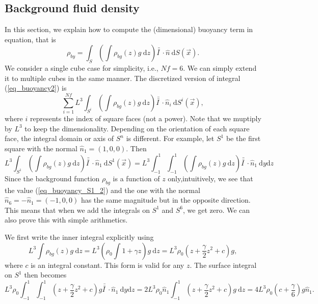  \subsection{Background fluid density}
In this section, we explain how to compute the (dimensional) buoyancy term in equation, that is
\begin{equation}
	\rho_{by} =
	 \int_{S} \left( 
	   \int  {\rho_{bg}} (z) g \ \textrm{d}z
	 \right) \bar{\bar{I \ }}  \cdot
	\hat{n} \ \textrm{d}S (\vec{x}).
\label{eq_buoyancy2}
\end{equation}
We consider a single cube case for simplicity, i.e., $Nf = 6$. We can simply extend it to multiple cubes in the same manner. The discretized version of integral (\ref{eq_buoyancy2}) is 
\begin{equation}
	\sum_{i=1}^{Nf}
	 L^3 \int_{S^i} \left( 
	   \int  {\rho_{bg}} (z) g  \ \textrm{d}z 
	 \right) \bar{\bar{I \ }}  \cdot
	\hat{n}_i \ \textrm{d}S^i (\vec{x}),
\label{eq_buoyancy_discrete2}
\end{equation}
where $i$ represents the index of square faces (not a power). Note that we muptiply by $L^3$ to keep the dimensionality. Depending on the orientation of each square face, the integral domain or axis of $S^n$ is different. For example, let $S^1$ be the first square with the normal $\hat{n}_1 = (1,0,0)$. Then 
\begin{equation}
	L^3 
	 \int_{S^1}
	 \left( 
	   \int  {\rho_{bg}} (z) g \ \textrm{d}z 
	 \right) \bar{\bar{I \ }}  \cdot
	\hat{n}_1 \ \textrm{d}S^1 (\vec{x})
	= L^3  \int_{-1}^{1} \int_{-1}^{1}
	\left( 
  	 \int  {\rho_{bg}} (z) g \ \textrm{d}z 
 	\right) \bar{\bar{I \ }}  \cdot
 	\hat{n}_1 \ 
	\textrm{d}y  \textrm{d}z 
\label{eq_buoyancy_S1_2}
\end{equation}
Since the background function $\rho_{bg}$ is a function of $z$ only,intuitively, we see that the value (\ref{eq_buoyancy_S1_2}) and the one with the normal $\hat{n}_6 = -\hat{n}_1 = (-1,0,0)$ has the same magnitude but in the opposite direction. This means that when we add the integrals on $S^1$ and $S^6$, we get zero. We can also prove this with simple arithmetics. 
\par
We first write the inner integral explicitly using
\[
L^3 \int  {\rho_{bg}} (z)g  \ \textrm{d}z 
 =  L^3 \left( \rho_0 \int  1+\gamma  z \right) g \ \textrm{d}z 
=L^3 \rho_0 \left(  z + \frac{\gamma}{2}z^2 + c \right) g,
\]
where $c$ is an integral constant. This form is valid for any $z$. The surface integral on $S^1$ then becomes 
\[
	L^3\rho_0  \int_{-1}^{1} \int_{-1}^{1}
  	\left( 
  	 z + \frac{\gamma}{2}z^2 + c 
 	\right) g \bar{\bar{I \ }}  \cdot
 	\hat{n}_1 \ 
	\textrm{d}y  \textrm{d}z 
	=
2L^3 \rho_0\hat{n}_1 
\int_{-1}^{1} 
  	\left( 
  	z + \frac{\gamma}{2}z^2 + c  
 	\right) g \ 
  \textrm{d}z 
  =4 L^3 \rho_0 \left( c + \frac{\gamma}{6} \right) g \hat{n}_1 .
\]
